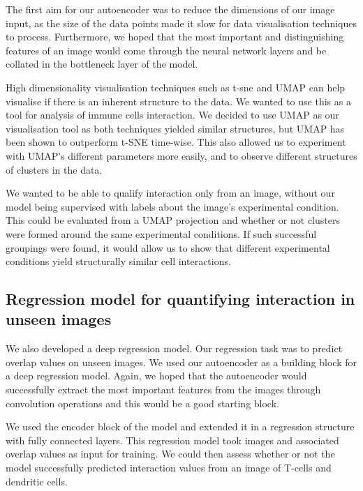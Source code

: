 The first aim for our autoencoder was to reduce the dimensions of our image input, as the size of the data points made it slow for data visualisation techniques to process. Furthermore, we hoped that the most important and distinguishing features of an image would come through the neural network layers and be collated in the bottleneck layer of the model.

High dimensionality visualisation techniques such as t-sne and UMAP can help visualise if there is an inherent structure to the data. We wanted to use this as a tool for analysis of immune cells interaction. We decided to use UMAP as our visualisation tool as both techniques yielded similar structures, but UMAP has been shown to outperform t-SNE time-wise. This also allowed us to experiment with UMAP's different parameters more easily, and to observe different structures of clusters in the data.

We wanted to be able to qualify interaction only from an image, without our model being supervised with labels about the image's experimental condition. This could be evaluated from a UMAP projection and whether or not clusters were formed around the same experimental conditions. If such successful groupings were found, it would allow us to show that different experimental conditions yield structurally similar cell interactions.

\subsection{Regression model for quantifying interaction in unseen images}

We also developed a deep regression model. Our regression task was to predict overlap values on unseen images. We used our autoencoder as a building block for a deep regression model. Again, we hoped that the autoencoder would successfully extract the most important features from the images through convolution operations and this would be a good starting block.

We used the encoder block of the model and extended it in a regression structure with fully connected layers. This regression model took images and associated overlap values as input for training. We could then assess whether or not the model successfully predicted interaction values from an image of T-cells and dendritic cells.
